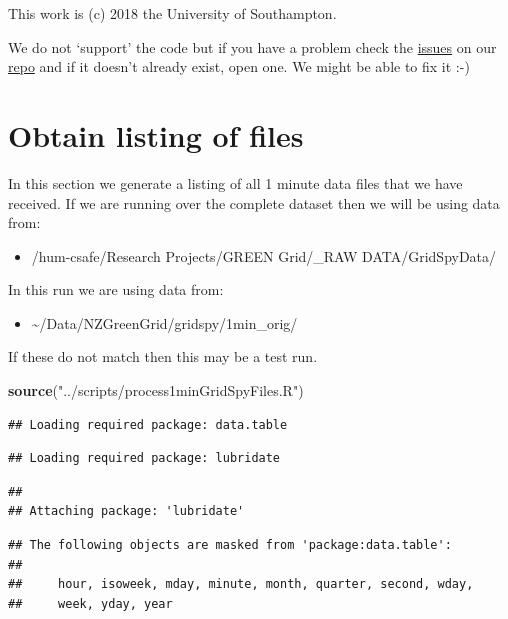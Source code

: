 \documentclass[]{article}
\newenvironment{Shaded}{\begin{snugshade}}{\end{snugshade}}
\newcommand{\KeywordTok}[1]{\textcolor[rgb]{0.13,0.29,0.53}{\textbf{#1}}}
\newcommand{\StringTok}[1]{\textcolor[rgb]{0.31,0.60,0.02}{#1}}
\newcommand{\NormalTok}[1]{#1}
\providecommand{\tightlist}{%
  \setlength{\itemsep}{0pt}\setlength{\parskip}{0pt}}
\begin{document}
This work is (c) 2018 the University of Southampton.

We do not `support' the code but if you have a problem check the
\href{https://git.soton.ac.uk/ba1e12/nzGREENGrid/issues}{issues} on our
\href{https://git.soton.ac.uk/ba1e12/nzGREENGrid}{repo} and if it
doesn't already exist, open one. We might be able to fix it :-)

\section{Obtain listing of files}\label{obtain-listing-of-files}

In this section we generate a listing of all 1 minute data files that we
have received. If we are running over the complete dataset then we will
be using data from:

\begin{itemize}
\tightlist
\item
  /hum-csafe/Research Projects/GREEN Grid/\_RAW DATA/GridSpyData/
\end{itemize}

In this run we are using data from:

\begin{itemize}
\tightlist
\item
  \textasciitilde{}/Data/NZGreenGrid/gridspy/1min\_orig/
\end{itemize}

If these do not match then this may be a test run.

\begin{Shaded}
\begin{Highlighting}[]
\KeywordTok{source}\NormalTok{(}\StringTok{"../scripts/process1minGridSpyFiles.R"}\NormalTok{)}
\end{Highlighting}
\end{Shaded}

\begin{verbatim}
## Loading required package: data.table
\end{verbatim}

\begin{verbatim}
## Loading required package: lubridate
\end{verbatim}

\begin{verbatim}
## 
## Attaching package: 'lubridate'
\end{verbatim}

\begin{verbatim}
## The following objects are masked from 'package:data.table':
## 
##     hour, isoweek, mday, minute, month, quarter, second, wday,
##     week, yday, year
\end{verbatim}
\end{document}
